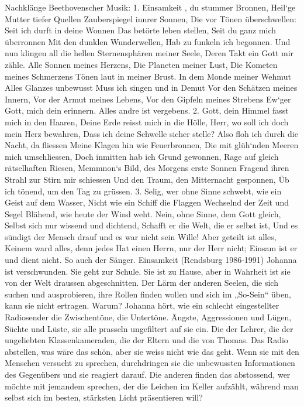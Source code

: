 Nachklänge Beethovenscher Musik:
1.
Einsamkeit , du stummer Bronnen,
Heil`ge Mutter  tiefer Quellen
Zauberspiegel innrer Sonnen, 
Die vor Tönen überschwellen:
Seit ich durft in deine Wonnen
Das betörte leben stellen,
Seit du ganz mich überronnen
Mit den dunklen Wunderwellen,
Hab zu funkeln ich begonnen.
Und nun klingen all die hellen
Sternensphären meiner Seele,
Deren Takt ein Gott mir zähle.
Alle Sonnen meines Herzens,
Die Planeten meiner Lust,
Die Kometen meines Schmerzens
Tönen laut in meiner Brust.
In dem Monde meiner Wehmut
Alles Glanzes unbewusst
Muss ich singen und in Demut
Vor den Schätzen meines Innern,
Vor der Armut meines Lebens,
Vor den Gipfeln meines Strebens
Ew`ger Gott, mich dein erinnern.
Alles andre ist vergebens.
2.
Gott, dein Himmel fasst mich in den Haaren,
Deine Erde reisst mich in die Hölle,
Herr, wo soll ich doch mein Herz bewahren,
Dass ich deine Schwelle sicher stelle?
Also floh ich durch die Nacht, da fliessen
Meine Klagen hin wie Feuerbronnen,
Die mit glüh`nden Meeren mich umschliessen,
Doch inmitten hab ich Grund gewonnen,
Rage auf gleich rätselhaften Riesen,
Memmnon`s Bild, des Morgens erste Sonnen
Fragend ihren Strahl zur Stirn mir schiessen
Und den Traum, den Mitternacht gesponnen,
Üb ich tönend, um den Tag zu grüssen.
3.
Selig, wer ohne Sinne
schwebt, wie ein Geist auf dem Wasser,
Nicht wie ein Schiff die Flaggen
Wechselnd der Zeit und Segel
Blähend, wie heute der Wind weht.
Nein, ohne Sinne, dem Gott gleich,
Selbst sich nur wissend und dichtend,
Schafft er die Welt, die er selbst ist,
Und es sündigt der Mensch drauf
und es war nicht sein Wille!
Aber geteilt ist alles,
Keinem ward alles, denn jedes
Hat einen Herrn, nur der Herr nicht;
Einsam ist er und dient nicht.
So auch der Sänger.
Einsamkeit (Rendsburg 1986-1991)
Johanna ist verschwunden. Sie geht zur Schule. Sie ist zu Hause, aber in Wahrheit ist sie von der Welt draussen abgeschnitten. Der Lärm der anderen Seelen, die sich suchen und ausprobieren, ihre Rollen finden wollen und sich im „So-Sein“ üben, kann sie nicht ertragen. Warum?
Johanna hört, wie ein schlecht eingestellter Radiosender die Zwischentöne, die Untertöne. Ängste, Aggressionen und Lügen, Süchte und Lüste, sie alle prasseln ungefiltert auf sie ein. Die der Lehrer, die der ungeliebten Klassenkameraden, die der Eltern und die von Thomas. Das Radio abstellen, was wäre das schön, aber sie weiss nicht wie das geht.
Wenn sie mit den Menschen versucht zu sprechen, durchdringen sie die unbewussten Informationen des Gegenübers und sie reagiert darauf. Die anderen finden das abstossend, wer möchte mit jemandem sprechen, der die Leichen im Keller aufzählt, während man selbst sich im besten, stärksten Licht präsentieren will?
